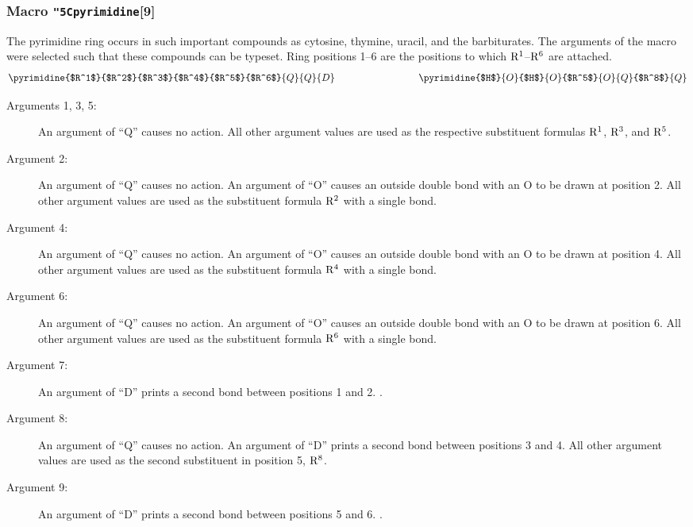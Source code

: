 \subsubsection{Macro {\tt\char"5C{}pyrimidine}[9]}
      The pyrimidine ring occurs in such important compounds
      as cytosine, thymine, uracil, and the barbiturates.
      The arguments of the macro were selected such that
      these compounds can be typeset. Ring positions 1--6
      are the positions to which ${\rm R^1}$--${\rm R^6}$
      are attached.
 \[ \pyrimidine{$R^1$}{$R^2$}{$R^3$}{$R^4$}{$R^5$}{$R^6$}
               {Q}{Q}{D}
    \hspace{3cm}
    \pyrimidine{$H$}{O}{$H$}{O}{$R^5$}{O}{Q}{$R^8$}{Q} \]
 
 \begin{description}
 \item[{\rm Arguments 1, 3, 5:}] An argument of ``Q''
      causes no action. All other argument values are used
      as the respective substituent formulas ${\rm R^1}$,
      ${\rm R^3}$, and ${\rm R^5}$.
 \item[{\rm Argument 2:}] An argument of ``Q'' causes
      no action. An argument of ``O'' causes an outside double
      bond with an O to be drawn at position 2. All other
      argument values are used as the substituent formula
      ${\rm R^2}$ with a single bond.
 \item[{\rm Argument 4:}] An argument of ``Q'' causes
      no action. An argument of ``O'' causes an outside double
      bond with an O to be drawn at position 4. All other
      argument values are used as the substituent formula
      ${\rm R^4}$ with a single bond.
 \item[{\rm Argument 6:}] An argument of ``Q'' causes
      no action. An argument of ``O'' causes an outside double
      bond with an O to be drawn at position 6. All other
      argument values are used as the substituent formula
      ${\rm R^6}$ with a single bond.
 \item[{\rm Argument 7:}] An argument of ``D''
      prints a second bond between positions 1 and 2. \rii .
 \item[{\rm Argument 8:}] An argument of ``Q'' causes
      no action. An argument of ``D'' prints a second bond
      between positions 3 and 4. All other argument values
      are used as the second substituent in position 5,
      ${\rm R^8}$.
 \item[{\rm  Argument 9:}] An argument of ``D''
      prints a second bond between positions 5 and 6. \rii .
 \end{description}
 
